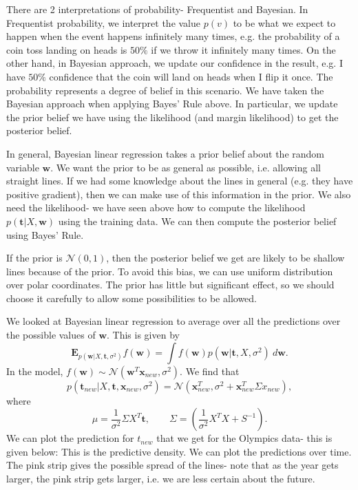 \documentclass[a4paper, openany]{memoir}
\begin{document}
    There are 2 interpretations of probability- Frequentist and Bayesian. In Frequentist probability, we interpret the value $p(v)$ to be what we expect to happen when the event happens infinitely many times, e.g. the probability of a coin toss landing on heads is $50\%$ if we throw it infinitely many times. On the other hand, in Bayesian approach, we update our confidence in the result, e.g. I have $50\%$ confidence that the coin will land on heads when I flip it once. The probability represents a degree of belief in this scenario. We have taken the Bayesian approach when applying Bayes' Rule above. In particular, we update the prior belief we have using the likelihood (and margin likelihood) to get the posterior belief.

    In general, Bayesian linear regression takes a prior belief about the random variable $\mathbf{w}$. We want the prior to be as general as possible, i.e. allowing all straight lines. If we had some knowledge about the lines in general (e.g. they have positive gradient), then we can make use of this information in the prior. We also need the likelihood- we have seen above how to compute the likelihood $p(\mathbf{t}| X, \mathbf{w})$ using the training data. We can then compute the posterior belief using Bayes' Rule. 
    

    If the prior is $\mathcal{N}(0, 1)$, then the posterior belief we get are likely to be shallow lines because of the prior. To avoid this bias, we can use uniform distribution over polar coordinates. The prior has little but significant effect, so we should choose it carefully to allow some possibilities to be allowed.

    We looked at Bayesian linear regression to average over all the predictions over the possible values of $\mathbf{w}$. This is given by
    \[\mathbf{E}_{p(\mathbf{w}|X, \mathbf{t}, \sigma^2)} f(\mathbf{w}) = \int f(\mathbf{w}) p(\mathbf{w}|\mathbf{t}, X, \sigma^2) \ d\mathbf{w}.\]
    In the model, $f(\mathbf{w}) \sim \mathcal{N}(\mathbf{w}^T \mathbf{x}_{new}, \sigma^2)$. We find that
    \[p(\mathbf{t}_{new} | X, \mathbf{t}, \mathbf{x}_{new}, \sigma^2) = \mathcal{N}(\mathbf{x}^T_{new}, \sigma^2 + \mathbf{x}_{new}^T \Sigma x_{new}),\]
    where
    \[\mu = \frac{1}{\sigma^2} \Sigma X^T \mathbf{t}, \qquad \Sigma = \left(\frac{1}{\sigma^2} X^TX + S^{-1}\right).\]
    We can plot the prediction for $t_{new}$ that we get for the Olympics data- this is given below:
    This is the predictive density. We can plot the predictions over time.
    The pink strip gives the possible spread of the lines- note that as the year gets larger, the pink strip gets larger, i.e. we are less certain about the future.
\end{document}
